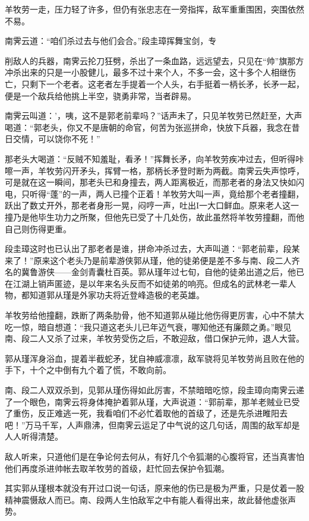 \documentclass[12pt,oneside]{book}
\begin{document}
羊牧劳一走，压力轻了许多，但仍有张忠志在一旁指挥，敌军重重围困，突围依然不易。

南霁云道：``咱们杀过去与他们会合。''段圭璋挥舞宝剑，专

削敌人的兵器，南霁云抡刀狂劈，杀出了一条血路，远远望去，只见在``帅''旗那方冲杀出来的只是一小股健儿，最多不过十来个人，不多一会，这十多个人相继伤亡，只剩下一个老者。这老者左手提着一个人头，右手挺着一柄长矛，长矛一起，便是一个敌兵给他挑上半空，骁勇非常，当者辟易。

南霁云叫道：'，咦，这不是郭老前辈吗？''话声未了，只见羊牧劳已然赶至，大声喝道：``郭老头，你又不是唐朝的命官，何苦为张巡拼命，快放下兵器，我念在昔日交情，可以饶你不死！''

那老头大喝道：``反贼不知羞耻，看矛！''挥舞长矛，向羊牧劳疾冲过去，但听得咔嚓一声，羊牧劳闪开矛头，挥臂一格，那柄长矛登时断为两截。南霁云失声惊呼，可是就在这一瞬间，那老头已和身撞去，两人距离极近，而那老者的身法又快如闪电，只听得``蓬''的一声，两人已撞个正着！羊牧劳大叫一声，竟给那个老者撞翻，跃出了数丈开外，那老者身形一晃，闷哼一声，吐出I一大口鲜血。原来老人这一撞乃是他毕生功力之所聚，但他先已受了十几处伤，故此虽然将羊牧劳撞翻，而他自己则伤得更重。

段圭璋这时也已认出了那老者是谁，拼命冲杀过去，大声叫道：``郭老前辈，段某来了！''原来这个老头乃是前辈游侠郭从瑾，他的徒弟便是差不多与南、段二人齐名的冀鲁游侠------金剑青囊杜百英。郭从瑾年过七旬，自他的徒弟出道之后，他已在江湖上销声匿迹，是以年来名头反而不如徒弟的响亮。但成名的武林老一辈人物，都知道郭从瑾是外家功夫将近登峰造极的老英雄。

羊牧劳给他撞翻，跌断了两条肋骨，他不知道郭从碰比他伤得更厉害，心中不禁大吃一惊，暗自想道：``我只道这老头儿已年迈气衰，哪知他还有廉颇之勇。''眼见南、段二人又杀了过来，羊牧劳受伤之后，不敢迎敌，借口保护元帅，退人大营。

郭从瑾浑身浴血，提着半截蛇矛，犹自神威凛凛，敌军骁将见羊牧劳尚且败在他的手下，十个之中倒有九个着了慌，不敢向前。

南、段二人双双杀到，见郭从瑾伤得如此厉害，不禁暗暗吃惊，段圭璋向南霁云递了一个眼色，南霁云将身体掩护着郭从瑾，大声说道：``郭前辈，那羊老贼业已受了重伤，反正难逃一死，我看咱们不必忙着取他的首级了，还是先杀进睢阳去吧！''万马千军，人声鼎沸，但南霁云运足了中气说的这几句话，周围的敌军却是人人听得清楚。

敌人听来，只道他们是在争论何去何从，有好几个令狐潮的心腹将官，还当真害怕他们再度杀进帅帐去取羊牧劳的首级，赶忙回去保护令狐潮。

其实郭从瑾根本就没有开过口说一句话，原来他的伤已是极为严重，只是仗着一股精神震慑敌人而已。南、段两人生怕敌军之中有能人看得出来，故此替他虚张声势。
\end{document}
